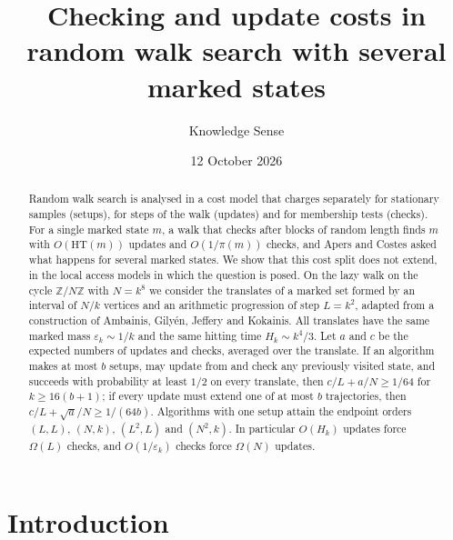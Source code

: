 \documentclass{amsart}
\theoremstyle{plain}
\theoremstyle{definition}
\theoremstyle{remark}
\newcommand{\Z}{\mathbb{Z}}
\newcommand{\eps}{\varepsilon}
\newcommand{\HT}{\mathrm{HT}}
\begin{document}
\title[Checking and update costs with several marked states]{Checking and update costs in random walk search with several marked states}
\author{Knowledge Sense}
\address{Knowledge Sense}
\date{12 October 2026}

\begin{abstract}
Random walk search is analysed in a cost model that charges separately for stationary samples (setups), for steps of the walk (updates) and for membership tests (checks). For a single marked state $m$, a walk that checks after blocks of random length finds $m$ with $O(\HT(m))$ updates and $O(1/\pi(m))$ checks, and Apers and Costes asked what happens for several marked states. We show that this cost split does not extend, in the local access models in which the question is posed. On the lazy walk on the cycle $\Z/N\Z$ with $N=k^8$ we consider the translates of a marked set formed by an interval of $N/k$ vertices and an arithmetic progression of step $L=k^2$, adapted from a construction of Ambainis, Gilyén, Jeffery and Kokainis. All translates have the same marked mass $\eps_k\sim 1/k$ and the same hitting time $H_k\sim k^4/3$. Let $a$ and $c$ be the expected numbers of updates and checks, averaged over the translate. If an algorithm makes at most $b$ setups, may update from and check any previously visited state, and succeeds with probability at least $1/2$ on every translate, then $c/L+a/N\ge 1/64$ for $k\ge 16(b+1)$; if every update must extend one of at most $b$ trajectories, then $c/L+\sqrt a/N\ge 1/(64b)$. Algorithms with one setup attain the endpoint orders $(L,L)$, $(N,k)$, $(L^2,L)$ and $(N^2,k)$. In particular $O(H_k)$ updates force $\Omega(L)$ checks, and $O(1/\eps_k)$ checks force $\Omega(N)$ updates.
\end{abstract}

\maketitle

\section{Introduction}
\end{document}
